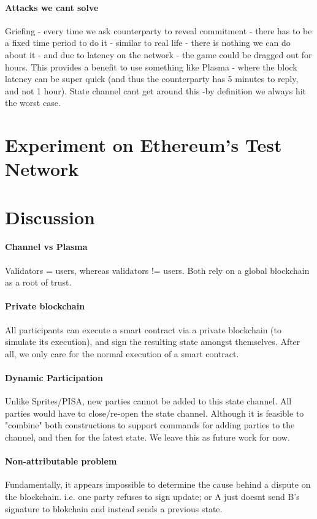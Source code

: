 \documentclass{llncs}
\begin{document}
\paragraph{Attacks we cant solve} Griefing - every time we ask counterparty to reveal commitment - there has to be a fixed time period to do it - similar to real life - there is nothing we can do about it - and due to latency on the network - the game could be dragged out for hours. This provides a benefit to use something like Plasma - where the block latency can be super quick (and thus the counterparty has 5 minutes to reply, and not 1 hour). State channel cant get around this -by definition we always hit the worst case. 

\section{Experiment on Ethereum's Test Network}

\section{Discussion} 

\paragraph{Channel vs Plasma} Validators = users, whereas validators != users. Both rely on a global blockchain as a root of trust. 

\paragraph{Private blockchain} All participants can execute a smart contract via a private blockchain (to simulate its execution), and sign the resulting state amongst themselves. After all, we only care for the normal execution of a smart contract. 

\paragraph{Dynamic Participation} Unlike Sprites/PISA, new parties cannot be added to this state channel. All parties would have to close/re-open the state channel. Although it is feasible to "combine" both constructions to support commands for adding parties to the channel, and then for the latest state. We leave this as future work for now. 


\paragraph{Non-attributable problem} Fundamentally, it appears impossible to determine the cause behind a dispute on the blockchain. i.e. one party refuses to sign update; or A just doesnt send B's signature to blokchain and instead sends a previous state.
\end{document}
